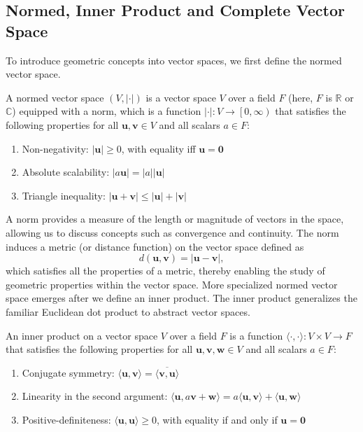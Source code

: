 \subsection{Normed, Inner Product and Complete Vector Space}\label{sec:normed_inner_product_complete_vector_space}
To introduce geometric concepts into vector spaces, we first define the normed vector space.
\begin{definition}
A normed vector space $(V,\lvert\cdot\rvert)$ is a vector space $V$ over a field $F$ (here, $F$ is $\mathbb{R}$ or $\mathbb{C}$) equipped with a norm, which is a function $\lvert\cdot\rvert:V\to\left[0,\infty\right)$ that satisfies the following properties for all $\symbf{u},\symbf{v}\in V$ and all scalars $a\in F$:
\begin{enumerate}[label=\arabic*.]
\item Non-negativity: $\lvert\symbf{u}\rvert\geq 0$, with equality iff $\symbf{u}=\symbf{0}$
\item Absolute scalability: $\lvert a\symbf{u}\rvert=\lvert a\rvert\lvert\symbf{u}\rvert$
\item Triangle inequality: $\lvert\symbf{u}+\symbf{v}\rvert\leq\lvert\symbf{u}\rvert+\lvert\symbf{v}\rvert$
\end{enumerate}
\end{definition}
A norm provides a measure of the length or magnitude of vectors in the space, allowing us to discuss concepts such as convergence and continuity. The norm induces a metric (or distance function) on the vector space defined as
\begin{equation}
d(\symbf{u},\symbf{v})=\lvert\symbf{u}-\symbf{v}\rvert,
\end{equation}
which satisfies all the properties of a metric, thereby enabling the study of geometric properties within the vector space. More specialized normed vector space emerges after we define an inner product. The inner product generalizes the familiar Euclidean dot product to abstract vector spaces.
\begin{definition}\label{def:inner_product}
An inner product on a vector space $V$ over a field $F$ is a function $\langle\cdot,\cdot\rangle:V\times V\to F$ that satisfies the following properties for all $\symbf{u},\symbf{v},\symbf{w}\in V$ and all scalars $a\in F$:
\begin{enumerate}[label=\arabic*.]
\item Conjugate symmetry: $\langle\symbf{u},\symbf{v}\rangle=\overline{\langle\symbf{v},\symbf{u}\rangle}$
\item Linearity in the second argument: $\langle \symbf{u},a\symbf{v}+\symbf{w}\rangle=a\langle\symbf{u},\symbf{v}\rangle+\langle\symbf{u},\symbf{w}\rangle$
\item Positive-definiteness: $\langle\symbf{u},\symbf{u}\rangle\geq 0$, with equality if and only if $\symbf{u}=\symbf{0}$
\end{enumerate}
\end{definition}
